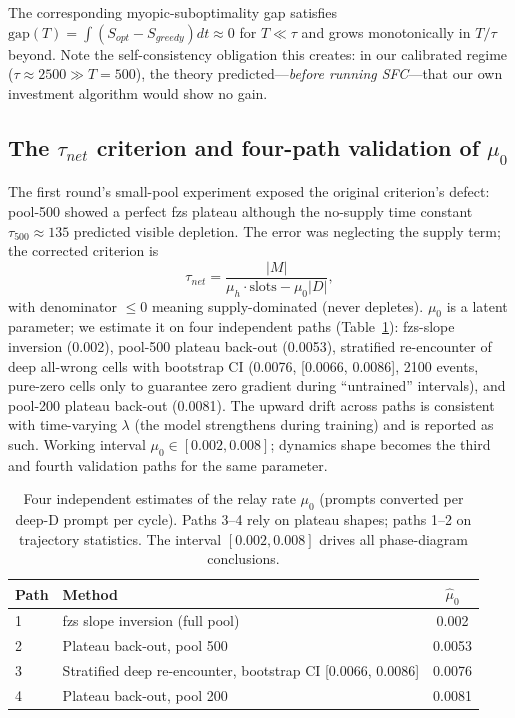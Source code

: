 \documentclass[11pt]{article}
\theoremstyle{definition}
\begin{document}
The corresponding myopic-suboptimality gap satisfies
$\mathrm{gap}(T)=\int(S_{opt}-S_{greedy})dt \approx 0$ for $T\ll\tau$ and grows
monotonically in $T/\tau$ beyond. Note the self-consistency obligation this
creates: in our calibrated regime ($\tau\approx2500\gg T{=}500$), the theory
predicted---\emph{before running SFC}---that our own investment algorithm would
show no gain.

\subsection{The $\tau_{net}$ criterion and four-path validation of $\mu_0$}\label{sec:l3-tau}
The first round's small-pool experiment exposed the original criterion's defect:
pool-500 showed a perfect fzs plateau although the no-supply time constant
$\tau_{500}\approx135$ predicted visible depletion. The error was neglecting the
supply term; the corrected criterion is
\begin{equation}\label{eq:taunet}
\tau_{net} = \frac{|M|}{\mu_h\cdot\text{slots} - \mu_0 |D|},
\end{equation}
with denominator $\le0$ meaning supply-dominated (never depletes). $\mu_0$ is a
latent parameter; we estimate it on four independent paths
(Table~\ref{tab:mu0}): fzs-slope inversion (0.002), pool-500 plateau back-out
(0.0053), stratified re-encounter of deep all-wrong cells with bootstrap CI
(0.0076, [0.0066, 0.0086], 2100 events, pure-zero cells only to guarantee zero
gradient during ``untrained'' intervals), and pool-200 plateau back-out (0.0081).
The upward drift across paths is consistent with time-varying $\lambda$ (the
model strengthens during training) and is reported as such. Working interval
$\mu_0\in[0.002,0.008]$; dynamics shape becomes the third and fourth validation
paths for the same parameter.

\begin{table}[t]
\centering\small
\caption{Four independent estimates of the relay rate $\mu_0$ (prompts converted
per deep-D prompt per cycle). Paths 3--4 rely on plateau shapes; paths 1--2 on
trajectory statistics. The interval $[0.002,0.008]$ drives all phase-diagram
conclusions.}
\label{tab:mu0}
\begin{tabular}{@{}llc@{}}
\toprule
Path & Method & $\hat\mu_0$ \\
\midrule
1 & fzs slope inversion (full pool) & 0.002 \\
2 & Plateau back-out, pool 500 & 0.0053 \\
3 & Stratified deep re-encounter, bootstrap CI [0.0066, 0.0086] & 0.0076 \\
4 & Plateau back-out, pool 200 & 0.0081 \\
\bottomrule
\end{tabular}
\end{table}
\end{document}
